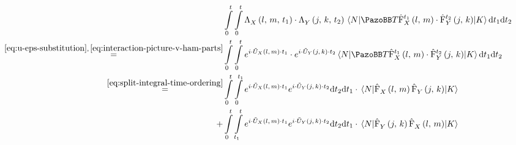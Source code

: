 \begin{equation}
    \label{eq:time-ordered-integral}
    \begin{split}
        &\int\limits_0^t \int\limits_0^t  
        \VhamiltonianAnalyticalPart{$X$}{l}{m}{t_1}
        \cdot 
        \VhamiltonianAnalyticalPart{$Y$}{j}{k}{t_2}
        \bracketHelper{N}{\timeOrderingOperator
            \VhamiltonianOperatorPart[t_1]{$X$}{l}{m}
        \cdot 
            \VhamiltonianOperatorPart[t_2]{$Y$}{j}{k}
        }{K}            \mathrm{d}t_1\mathrm{d}t_2\\
        \stackrel{\ref{eq:u-eps-substitution},\,\ref{eq:interaction-picture-v-ham-parts}}{=}
        &\int\limits_0^t \int\limits_0^t  
        e^{
            i \cdot \ueps{$X$}{l}{m} \cdot t_1
        }
        \cdot 
        e^{
            i \cdot \ueps{$Y$}{j}{k} \cdot t_2
        }
        \bracketHelper{N}{\timeOrderingOperator
            \VhamiltonianOperatorPart[t_1]{$X$}{l}{m}
        \cdot 
            \VhamiltonianOperatorPart[t_2]{$Y$}{j}{k}
        }{K}            \mathrm{d}t_1\mathrm{d}t_2\\
        \stackrel{\ref{eq:split-integral-time-ordering}}{=}
        &\int\limits_0^t  \int\limits_0^{t_1}
        e^{
            i \cdot \ueps{$X$}{l}{m} \cdot t_1
        }
        e^{
            i \cdot \ueps{$Y$}{j}{k} \cdot t_2
        }
        \mathrm{d}t_2
        \mathrm{d}t_1
        \cdot 
        \bracketHelper{N}{
            \VhamiltonianOperatorPart[]{$X$}{l}{m}
            \VhamiltonianOperatorPart[]{$Y$}{j}{k}
        }{K}           \\ +
        &\int\limits_0^t  \int\limits_{t_1}^t
        e^{
            i \cdot \ueps{$X$}{l}{m} \cdot t_1
        }
        e^{
            i \cdot \ueps{$Y$}{j}{k} \cdot t_2
        }
        \mathrm{d}t_2
        \mathrm{d}t_1
        \cdot 
        \bracketHelper{N}{
            \VhamiltonianOperatorPart[]{$Y$}{j}{k}
            \VhamiltonianOperatorPart[]{$X$}{l}{m}
        }{K} 
    \end{split}
\end{equation}

